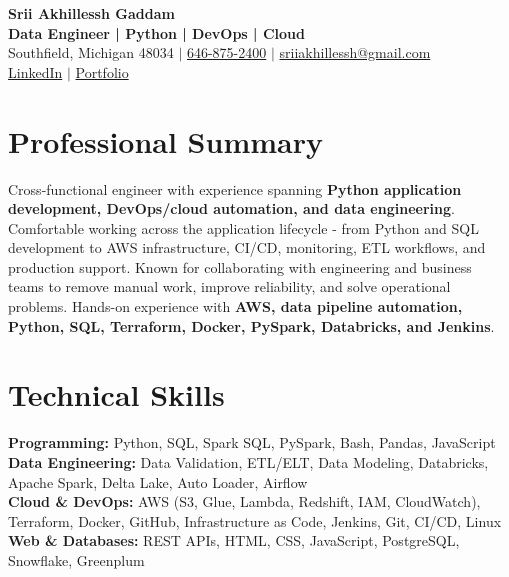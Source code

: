\documentclass[letterpaper,10pt]{article}
\begin{document}
\fontsize{9.35pt}{10.45pt}\selectfont

\begin{center}
    {\LARGE \textbf{Srii Akhillessh Gaddam}} \\[-1pt]
    \textbf{Data Engineer | Python | DevOps | Cloud} \\[2pt]
    Southfield, Michigan 48034 $|$
    \href{tel:6468752400}{646-875-2400} $|$
    \href{mailto:sriiakhillessh@gmail.com}{sriiakhillessh@gmail.com} \\[1pt]
    \href{https://www.linkedin.com/in/srii-akhiilessh-gaddam-b48668191/}{LinkedIn} $|$
    \href{https://sriiakhillesshg.github.io/portfolio/}{Portfolio}
\end{center}
\vspace{-8pt}

\section{Professional Summary}
\small{Cross-functional engineer with experience spanning \textbf{Python application development, DevOps/cloud automation, and data engineering}. Comfortable working across the application lifecycle - from Python and SQL development to AWS infrastructure, CI/CD, monitoring, ETL workflows, and production support. Known for collaborating with engineering and business teams to remove manual work, improve reliability, and solve operational problems. Hands-on experience with \textbf{AWS, data pipeline automation, Python, SQL, Terraform, Docker, PySpark, Databricks, and Jenkins}.}

\section{Technical Skills}
\small{
\textbf{Programming:} Python, SQL, Spark SQL, PySpark, Bash, Pandas, JavaScript \\
\textbf{Data Engineering:} Data Validation, ETL/ELT, Data Modeling, Databricks, Apache Spark, Delta Lake, Auto Loader, Airflow \\
\textbf{Cloud \& DevOps:} AWS (S3, Glue, Lambda, Redshift, IAM, CloudWatch), Terraform, Docker, GitHub, Infrastructure as Code, Jenkins, Git, CI/CD, Linux \\
\textbf{Web \& Databases:} REST APIs, HTML, CSS, JavaScript, PostgreSQL, Snowflake, Greenplum
}
\end{document}
